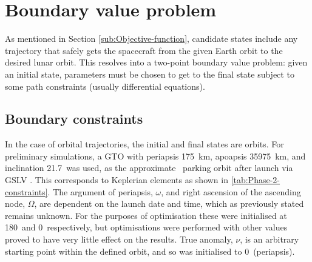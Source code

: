 
\section{Boundary value problem} \label{sec:BVP}

As mentioned in Section \ref{sub:Objective-function}, candidate states include any trajectory that safely gets the spacecraft from the given Earth orbit to the desired lunar orbit. This resolves into a two-point boundary value problem: given an initial state, parameters must be chosen to get to the final state subject to some path constraints (usually differential equations).


\subsection{Boundary constraints} \label{sub:Boundary-constraints}

In the case of orbital trajectories, the initial and final states are orbits. For preliminary simulations, a GTO with periapsis 175~km, apoapsis 35975~km, and inclination 21.7\degrees\ was used, as the approximate \BW\ parking orbit after launch via GSLV \parencite{GSLV}. This corresponds to Keplerian elements as shown in \autoref{tab:Phase-2-constraints}. The argument of periapsis, $\omega$, and right ascension of the ascending node, $\Omega$, are dependent on the launch date and time, which as previously stated remains unknown. For the purposes of optimisation these were initialised at 180\degrees\ and 0\degrees\ respectively, but optimisations were performed with other values proved to have very little effect on the results. True anomaly, $\nu$, is an arbitrary starting point within the defined orbit, and so was initialised to 0\degrees\ (periapsis).

